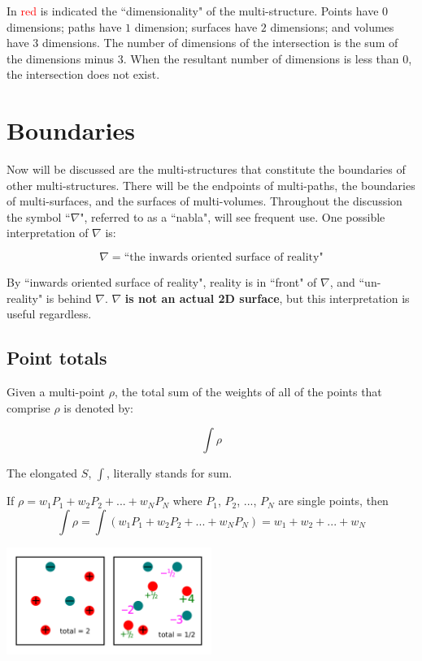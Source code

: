 \documentclass{book}
\newcommand{\red}[1]{\textcolor{red}{#1}}
\begin{document}
\vspace{5mm}

In \red{red} is indicated the ``dimensionality" of the multi-structure. Points have \(0\) dimensions; paths have \(1\) dimension; surfaces have \(2\) dimensions; and volumes have \(3\) dimensions. The number of dimensions of the intersection is the sum of the dimensions minus \(3\). When the resultant number of dimensions is less than \(0\), the intersection does not exist.



\chapter{Boundaries}

Now will be discussed are the multi-structures that constitute the boundaries of other multi-structures. There will be the endpoints of multi-paths, the boundaries of multi-surfaces, and the surfaces of multi-volumes. Throughout the discussion the symbol ``\(\nabla\)", referred to as a ``nabla", will see frequent use. One possible interpretation of \(\nabla\) is:

\[\nabla = \text{``the inwards oriented surface of reality"}\]

By ``inwards oriented surface of reality", reality is in ``front" of \(\nabla\), and ``un-reality" is behind \(\nabla\). \(\nabla\) {\bf is not an actual 2D surface}, but this interpretation is useful regardless.



\section{Point totals}

Given a multi-point \(\rho\), the total sum of the weights of all of the points that comprise \(\rho\) is denoted by:

\[\int \rho\]

The elongated \(S\), \(\int\), literally stands for sum.

If \(\rho = w_1 P_1 + w_2 P_2 + ... + w_N P_N\) where \(P_1\), \(P_2\), ..., \(P_N\) are single points, then
\[\int \rho = \int (w_1 P_1 + w_2 P_2 + ... + w_N P_N) = w_1 + w_2 + ... + w_N\]

\begin{center} 
\includegraphics[width = 0.5\textwidth]{Point_totals/multi-point_sums}
\end{center}
\end{document}
